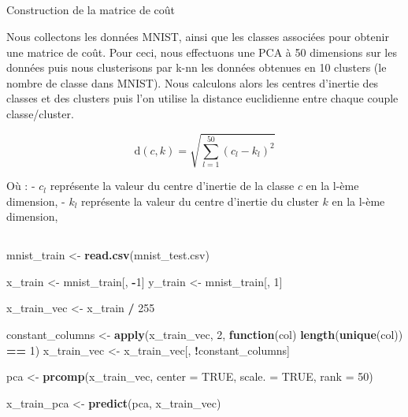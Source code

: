 \documentclass[
]{article}
\newenvironment{Shaded}{\begin{snugshade}}{\end{snugshade}}
\newcommand{\AttributeTok}[1]{\textcolor[rgb]{0.13,0.29,0.53}{#1}}
\newcommand{\ConstantTok}[1]{\textcolor[rgb]{0.56,0.35,0.01}{#1}}
\newcommand{\ControlFlowTok}[1]{\textcolor[rgb]{0.13,0.29,0.53}{\textbf{#1}}}
\newcommand{\DecValTok}[1]{\textcolor[rgb]{0.00,0.00,0.81}{#1}}
\newcommand{\FunctionTok}[1]{\textcolor[rgb]{0.13,0.29,0.53}{\textbf{#1}}}
\newcommand{\NormalTok}[1]{#1}
\newcommand{\OtherTok}[1]{\textcolor[rgb]{0.56,0.35,0.01}{#1}}
\newcommand{\SpecialCharTok}[1]{\textcolor[rgb]{0.81,0.36,0.00}{\textbf{#1}}}
\newcommand{\StringTok}[1]{\textcolor[rgb]{0.31,0.60,0.02}{#1}}
\begin{document}
\hypertarget{section-2}{%
\subsection{}\label{section-2}}

Construction de la matrice de coût

Nous collectons les données MNIST, ainsi que les classes associées pour
obtenir une matrice de coût. Pour ceci, nous effectuons une PCA à 50
dimensions sur les données puis nous clusterisons par k-nn les données
obtenues en 10 clusters (le nombre de classe dans MNIST). Nous calculons
alors les centres d'inertie des classes et des clusters puis l'on
utilise la distance euclidienne entre chaque couple classe/cluster.

\[
\text{d}(c, k) = \sqrt{\sum_{l=1}^{50} (c_{l} - k_{l})^2}
\]

Où : - \(c_l\) représente la valeur du centre d'inertie de la classe
\(c\) en la l-ème dimension, - \(k_l\) représente la valeur du centre
d'inertie du cluster \(k\) en la l-ème dimension,

\hypertarget{section-3}{%
\subsection{}\label{section-3}}

\begin{Shaded}
\begin{Highlighting}[]
\NormalTok{mnist\_train }\OtherTok{\textless{}{-}}  \FunctionTok{read.csv}\NormalTok{(}\StringTok{\textquotesingle{}mnist\_test.csv\textquotesingle{}}\NormalTok{)}

\NormalTok{x\_train }\OtherTok{\textless{}{-}}\NormalTok{ mnist\_train[, }\SpecialCharTok{{-}}\DecValTok{1}\NormalTok{]}
\NormalTok{y\_train }\OtherTok{\textless{}{-}}\NormalTok{ mnist\_train[, }\DecValTok{1}\NormalTok{]}

\NormalTok{x\_train\_vec }\OtherTok{\textless{}{-}}\NormalTok{ x\_train }\SpecialCharTok{/} \DecValTok{255}

\NormalTok{constant\_columns }\OtherTok{\textless{}{-}} \FunctionTok{apply}\NormalTok{(x\_train\_vec, }\DecValTok{2}\NormalTok{, }\ControlFlowTok{function}\NormalTok{(col) }\FunctionTok{length}\NormalTok{(}\FunctionTok{unique}\NormalTok{(col)) }\SpecialCharTok{==} \DecValTok{1}\NormalTok{)}
\NormalTok{x\_train\_vec }\OtherTok{\textless{}{-}}\NormalTok{ x\_train\_vec[, }\SpecialCharTok{!}\NormalTok{constant\_columns]}

\NormalTok{pca }\OtherTok{\textless{}{-}} \FunctionTok{prcomp}\NormalTok{(x\_train\_vec, }\AttributeTok{center =} \ConstantTok{TRUE}\NormalTok{, }\AttributeTok{scale. =} \ConstantTok{TRUE}\NormalTok{, }\AttributeTok{rank =} \DecValTok{50}\NormalTok{)}

\NormalTok{x\_train\_pca }\OtherTok{\textless{}{-}} \FunctionTok{predict}\NormalTok{(pca, x\_train\_vec)}
\end{Highlighting}
\end{Shaded}
\end{document}
